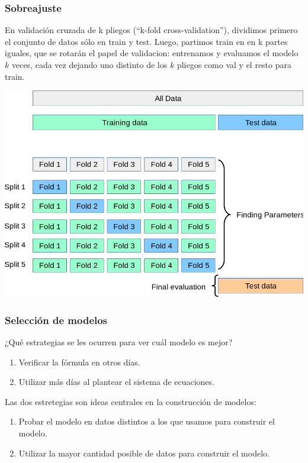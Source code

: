 \documentclass[aspectratio=169,12pt]{beamer}
\begin{document}

\begin{frame}
\frametitle{Sobreajuste}

En validación cruzada de k pliegos (``k-fold cross-validation''), dividimos primero el conjunto de datos sólo en
train y test. Luego, partimos train en en k partes iguales, que se rotarán el papel de validacion: entrenamos y
evaluamos el modelo $k$ veces, cada vez dejando uno distinto de los $k$ pliegos como val y el resto para train.

\begin{center}
\includegraphics[scale=0.5]{clase10-grid_search_cross_validation.png}
\end{center}


\end{frame}



\begin{frame}
\frametitle{Selección de modelos}

¿Qué estrategias se les ocurren para ver cuál modelo es mejor? \pause

\begin{enumerate}
\item Verificar la fórmula en otros días. \pause
\item Utilizar más días al plantear el sistema de ecuaciones.
\end{enumerate}

\pause

Las dos estretegias son ideas centrales en la construcción de modelos:
\begin{enumerate}
\item Probar el modelo en datos distintos a los que usamos para construir el modelo.
\item Utilizar la mayor cantidad posible de datos para construir el modelo.
\end{enumerate}

\end{frame}
\end{document}
